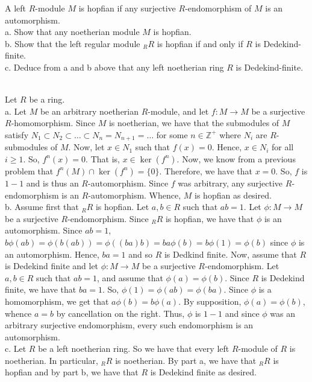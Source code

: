 A left $R$-module $M$ is hopfian if any surjective $R$-endomorphism of $M$ is an automorphism.\\
a. Show that any noetherian module $M$ is hopfian.\\
b. Show that the left regular module $_RR$ is hopfian if and only if $R$ is Dedekind-finite.\\
c. Deduce from a and b above that any left noetherian ring $R$ is Dedekind-finite.\\

\begin{solution}\renewcommand{\qedsymbol}{}\ \\
    Let $R$ be a ring.\\

    a. Let $M$ be an arbitrary noetherian $R$-module, and let $f:M\rightarrow M$ be a surjective
    $R$-homomorphism. Since $M$ is noetherian, we have that the submodules of $M$ satisfy
    $N_1\subset N_2\subset\ldots\subset N_n=N_{n+1}=\ldots$ for some $n\in\mathbb{Z}^+$ where $N_i$ are
    $R$-submodules of $M$. Now, let $x\in N_1$ such that $f(x)=0$. Hence, $x\in N_i$ for all $i\geq1$.
    So, $f^n(x)=0$. That is, $x\in\ker(f^n)$. Now, we know from a previous problem that
    $f^n(M)\cap\ker(f^n)=\{0\}$. Therefore, we have that $x=0$. So, $f$ is $1-1$ and is thus an
    $R$-automorphism. Since $f$ was arbitrary, any surjective $R$-endomorphism is an $R$-automorphism.
    Whence, $M$ is hopfian as desired.\\

    b. Assume first that $_RR$ is hopfian. Let $a,b\in R$ such that $ab=1$. Let $\phi:M\rightarrow M$ be
    a surjective $R$-endomorphism. Since $_RR$ is hopfian, we have that $\phi$ is an automorphism. Since
    $ab=1$, $b\phi(ab)=\phi(b(ab))=\phi((ba)b)=ba\phi(b)=b\phi(1)=\phi(b)$ since $\phi$ is an
    automorphism. Hence, $ba=1$ and so $R$ is Dedkind finite. Now, assume that $R$ is Dedekind finite
    and let $\phi:M\rightarrow M$ be a surjective $R$-endomorphism. Let $a,b\in R$ such that $ab=1$, and
    assume that $\phi(a)=\phi(b)$. Since $R$ is Dedekind finite, we have that $ba=1$. So,
    $\phi(1)=\phi(ab)=\phi(ba)$. Since $\phi$ is a homomorphism, we get that $a\phi(b)=b\phi(a)$. By
    supposition, $\phi(a)=\phi(b)$, whence $a=b$ by cancellation on the right. Thus, $\phi$ is $1-1$ and
    since $\phi$ was an arbitrary surjective endomorphism, every such endomorphism is an automorphism.\\

    c. Let $R$ be a left noetherian ring. So we have that every left $R$-module of $R$ is noetherian. In
    particular, $_RR$ is noetherian. By part a, we have that $_RR$ is hopfian and by part b, we have
    that $R$ is Dedekind finite as desired.


\end{solution}